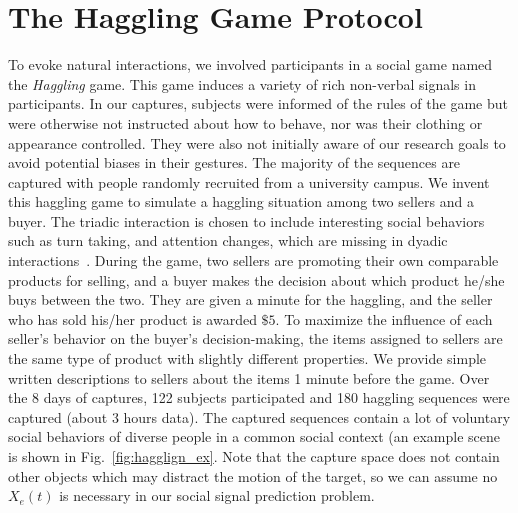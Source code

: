 \section{The Haggling Game Protocol}
To evoke natural interactions, we involved participants in a social game named the \emph{Haggling} game. This game induces a variety of rich non-verbal signals in participants. In our captures, subjects were informed of the rules of the game but were otherwise not instructed about how to behave, nor was their clothing or appearance controlled. They were also not initially aware of our research goals to avoid potential biases in their gestures. The majority of the sequences are captured with people randomly recruited from a university campus. We invent this haggling game to simulate a haggling situation among two sellers and a buyer. The triadic interaction is chosen to include interesting social behaviors such as turn taking, and attention changes, which are missing in dyadic interactions~\cite{rehg2013decoding}. During the game, two sellers are promoting their own comparable products for selling, and a buyer makes the decision about which product he/she buys between the two. They are given a minute for the haggling, and the seller who has sold his/her product is awarded $\$5$. To maximize the influence of each seller's behavior on the buyer's decision-making, the items assigned to sellers are the same type of product with slightly different properties. We provide simple written descriptions to sellers about the items 1 minute before the game. Over the 8 days of captures, 122 subjects participated and 180 haggling sequences were captured (about 3 hours data). The captured sequences contain a lot of voluntary social behaviors of diverse people in a common social context (an example scene is shown in Fig.~\ref{fig:hagglign_ex}. Note that the capture space does not contain other objects which may distract the motion of the target, so we can assume no $X_e(t)$ is necessary in our social signal prediction problem.

